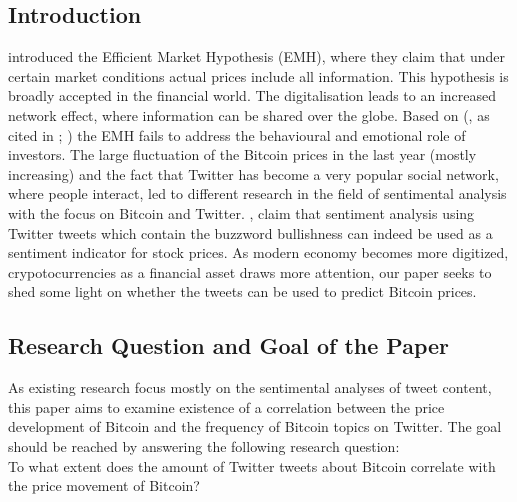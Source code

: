 \documentclass[a4paper,american,12pt]{article}
\begin{document}
\clearpage

\begin{spacing}{1.2}
\cleardoublepage{}
\section{Introduction}
\label{sec:intro}

\textcite[p.~388]{malkiel1970efficient} introduced the Efficient Market Hypothesis (EMH), where they claim that under certain market conditions actual prices include all information. This hypothesis is broadly accepted in the financial world. The digitalisation leads to an increased network effect, where information can be shared over the globe. Based on \citeauthor{mao2015quantifying} (\citeyear[][p.~3]{mao2015quantifying}, as cited in \cite[][pp.~175--195]{shiller2015irrational}; \cite[][pp.~279]{kahneman2013prospect}) the EMH fails to address the behavioural and emotional role of investors. The large fluctuation of the Bitcoin prices in the last year (mostly increasing) and the fact that Twitter has become a very popular social network, where people interact, led to different research in the field of sentimental analysis with the focus on Bitcoin and Twitter. \textcite[p.~18]{mao2015quantifying}, claim that sentiment analysis using Twitter tweets which contain the buzzword bullishness can indeed be used as a sentiment indicator for stock prices. As modern economy becomes more digitized, crypotocurrencies as a financial asset draws more attention, our paper seeks to shed some light on whether the tweets can be used to predict Bitcoin prices.

\subsection{Research Question and Goal of the Paper}
\label{sec:ResearchQandGoal}

As existing research focus mostly on the sentimental analyses of tweet content, this paper aims to examine existence of a correlation between the price development of Bitcoin and the frequency of Bitcoin topics on Twitter. The goal should be reached by answering the following research question: \\
To what extent does the amount of Twitter tweets about Bitcoin correlate with the price movement of Bitcoin?



\end{spacing}
\end{document}
